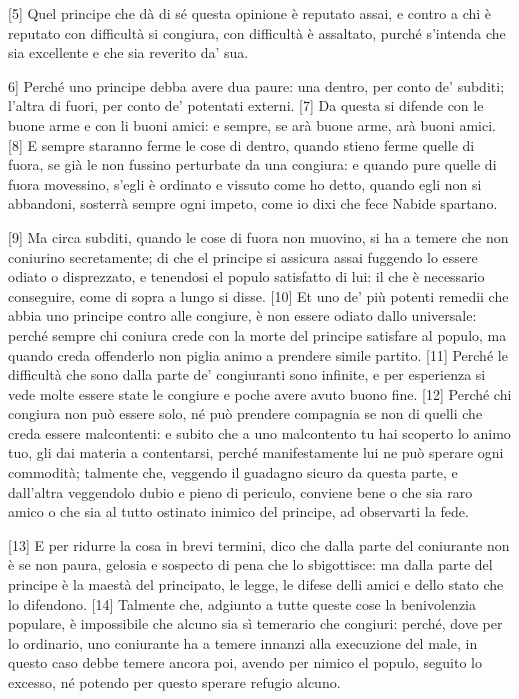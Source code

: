 {[}5{]} Quel principe che dà di sé questa opinione è reputato assai, e
contro a chi è reputato con difficultà si congiura, con difficultà è
assaltato, purché s'intenda che sia excellente e che sia reverito da'
sua.

\quebra

\noindent{}{[}6{]} Perché uno principe debba avere dua paure: una dentro, per
conto de' subditi; l'altra di fuori, per conto de' potentati externi.
{[}7{]} Da questa si difende con le buone arme e con li buoni amici: e
sempre, se arà buone arme, arà buoni amici. {[}8{]} E sempre staranno
ferme le cose di dentro, quando stieno ferme quelle di fuora, se già le
non fussino perturbate da una congiura: e quando pure quelle di fuora
movessino, s'egli è ordinato e vissuto come ho detto, quando egli non si
abbandoni, sosterrà sempre ogni impeto, come io dixi che fece Nabide
spartano.

{[}9{]} Ma circa subditi, quando le cose di fuora non muovino, si ha a
temere che non coniurino secretamente; di che el principe si assicura
assai fuggendo lo essere odiato o disprezzato, e tenendosi el populo
satisfatto di lui: il che è necessario conseguire, come di sopra a lungo
si disse. {[}10{]} Et uno de' più potenti remedii che abbia uno principe
contro alle congiure, è non essere odiato dallo universale: perché
sempre chi coniura crede con la morte del principe satisfare al populo,
ma quando creda offenderlo non piglia animo a prendere simile partito.
{[}11{]} Perché le difficultà che sono dalla parte de' congiuranti sono
infinite, e per esperienza si vede molte essere state le congiure e
poche avere avuto buono fine. {[}12{]} Perché chi congiura non può
essere solo, né può prendere compagnia se non di quelli che creda essere
malcontenti: e subito che a uno malcontento tu hai scoperto lo animo
tuo, gli dai materia a contentarsi, perché manifestamente lui ne può
sperare ogni commodità; talmente che, veggendo il guadagno sicuro da
questa parte, e dall'altra veggendolo dubio e pieno di periculo,
conviene bene o che sia raro amico o che sia al tutto ostinato inimico
del principe, ad observarti la fede.

{[}13{]} E per ridurre la cosa in brevi termini, dico che dalla parte
del coniurante non è se non paura, gelosia e sospecto di pena che lo
sbigottisce: ma dalla parte del principe è la maestà del principato, le
legge, le difese delli amici e dello stato che lo difendono. {[}14{]}
Talmente che, adgiunto a tutte queste cose la benivolenzia populare, è
impossibile che alcuno sia sì temerario che congiuri: perché, dove per
lo ordinario, uno coniurante ha a temere innanzi alla execuzione del
male, in questo caso debbe temere ancora poi, avendo per nimico el
populo, seguito lo excesso, né potendo per questo sperare refugio
alcuno.

